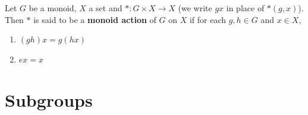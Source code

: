\documentclass{book}
\begin{document}
	\begin{defn}
		Let $G$ be a monoid, $X$ a set and $*: G \times X \rightarrow X$ (we write $gx$ in place of $*(g,x)$). Then $*$ is said to be a \textbf{monoid action} of $G$ on $X$ if for each $g,h \in G$ and $x \in X$,
		\begin{enumerate}
			\item $(gh)x = g(hx)$
			\item $ex = x$
		\end{enumerate}
	\end{defn}
	
	
	
	
	
	
	
	
	
	
	
	
	
	
	
	
	
	
	
	
	
	
	
	
	
	
	
	
	
	
	
	
	
	
	
	
	
	
	
	
	
	
	
	
	
	
	
	
	
	
	
	
	
	
	
	
	
	
	
	\section{Subgroups}
	
	
	
	
	
	
	
	
	
	
	
	
	
	
	
	
	
	
	
	
	
	
	
	
	
\end{document}
